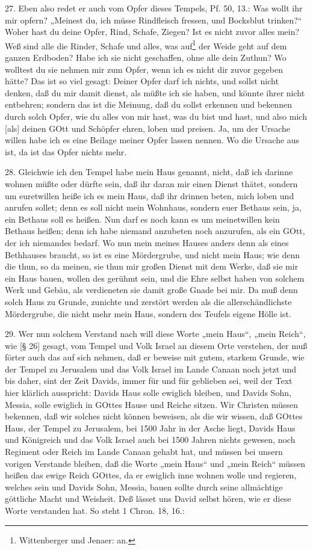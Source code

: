 27. Eben also redet er auch vom Opfer dieses Tempels, Pf. 50, 13.: Was wollt ihr mir opfern? „Meinest du, ich müsse Rindfleisch fressen, und Bocksblut trinken?“ Woher hast du deine Opfer, Rind, Schafe, Ziegen? Ist es nicht zuvor alles mein? Weß sind alle die Rinder, Schafe und alles, was auf\footnote{Wittenberger und Jenaer: an.} der Weide geht auf dem ganzen Erdboden? Habe ich sie
nicht geschaffen, ohne alle dein Zuthun? Wo wolltest du sie nehmen mir zum Opfer, wenn ich es nicht dir zuvor gegeben hätte? Das ist so viel gesagt: Deiner Opfer darf ich nichts, und sollst nicht denken, daß du mir damit dienst, als müßte ich sie haben, und könnte ihrer nicht entbehren; sondern das ist die Meinung, daß du sollst erkennen und bekennen durch solch Opfer, wie du alles von mir hast, was du bist und hast, und also mich [als] deinen GOtt und Schöpfer ehren, loben und preisen. Ja, um der Ursache willen habe ich es eine Beilage meiner Opfer lassen nennen. Wo die Ursache aus ist, da ist das Opfer nichts mehr.

28. Gleichwie ich den Tempel habe mein Haus genannt, nicht, daß ich darinne wohnen müßte oder dürfte sein, daß ihr daran mir einen Dienst thätet, sondern um euretwillen heiße ich es mein Haus, daß ihr drinnen beten, mich loben und anrufen sollet; denn es soll nicht mein Wohnhaus, sondern euer Bethaus sein, ja, ein Bethaus soll es heißen. Nun darf es noch kann es um meinetwillen kein Bethaus heißen; denn ich habe niemand anzubeten noch anzurufen, als ein GOtt, der ich niemandes bedarf. Wo nun mein meines Hauses anders denn als eines Bethhauses braucht, so ist es eine Mördergrube, und nicht mein Haus; wie denn die thun, so da meinen, sie thun mir großen Dienst mit dem Werke, daß sie mir ein Haus bauen, wollen des gerühmt sein, und die Ehre selbst haben von solchem Werk und Gebäu, als verdieneten sie damit große Gnade bei mir. Da muß denn solch Haus zu Grunde, zunichte und zerstört werden als die allerschändlichste Mördergrube, die nicht mehr mein Haus, sondern des Teufels eigene Hölle ist.

29. Wer nun solchem Verstand nach will diese Worte „mein Haus“, „mein Reich“, wie [§ 26] gesagt, vom Tempel und Volk Israel an diesem Orte verstehen, der muß förter auch das auf sich nehmen, daß er beweise mit gutem, starkem Grunde, wie der Tempel zu Jerusalem und das Volk Israel im Lande Canaan noch jetzt und bis daher, sint der Zeit Davids, immer für und für geblieben sei, weil der Text hier klärlich ausspricht: Davids Haus solle ewiglich bleiben, und Davids Sohn, Messia, solle ewiglich in GOttes Hause und Reiche sitzen. Wir Christen müssen bekennen, daß wir solches nicht können beweisen, als die wir wissen, daß GOttes Haus, der Tempel zu Jerusalem, bei 1500 Jahr in der Asche liegt, Davids Haus und Königreich und das Volk Israel auch bei 1500 Jahren nichts gewesen, noch Regiment oder Reich im Lande Canaan gehabt hat, und müssen bei unsern vorigen Verstande bleiben, daß die Worte „mein Haus“ und „mein Reich“ müssen heißen das ewige Reich GOttes, da er ewiglich inne wohnen wolle und regieren, welches sein und Davids Sohn, Messia, bauen sollte durch seine allmächtige göttliche Macht und Weisheit. Deß lässet uns David selbst hören, wie er diese Worte verstanden hat. So steht 1 Chron. 18, 16.:

